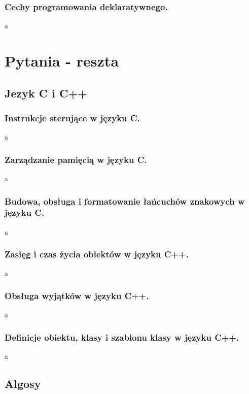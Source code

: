 \documentclass[a4paper,12pt,oneside]{book}
\begin{document}
			\newpage\subsection{\color{red}Cechy programowania deklaratywnego.}
				a
	
	\chapter{Pytania - reszta}
	
		\section{Jezyk C i C++}
			\subsection{\color{red}Instrukcje sterujące w języku C.}
				a
			\newpage\subsection{\color{red}Zarządzanie pamięcią w języku C.}
				a
			\newpage\subsection{\color{red}Budowa, obsługa i formatowanie łańcuchów znakowych w języku C.}
				a
			\newpage\subsection{\color{red}Zasięg i czas życia obiektów w języku C++.}
				a
			\newpage\subsection{\color{red}Obsługa wyjątków w języku C++.}
				a
			\newpage\subsection{\color{red}Definicje obiektu, klasy i szablonu klasy w języku C++.}
				a
		
		\newpage\section{Algosy}
\end{document}
